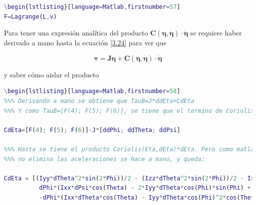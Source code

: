 \documentclass[twoside,11pt]{book}
\begin{document}
\begin{lstlisting}[language=Matlab,firstnumber=56]
\begin{lstlisting}[language=Matlab,firstnumber=57]
F=Lagrange(L,v)
\end{lstlisting}


Para tener una expresión analítica del producto $\pmb{C(\eta,\dot{\eta})\cdot \dot{\eta}}$ se requiere haber derivado a mano hasta la ecuación \ref{3.24} para ver que 

\begin{equation}
\pmb{\tau}=\pmb{J}\ddot{\pmb{\eta}} + \pmb{C(\eta,\dot{\eta})\cdot \dot{\eta}}
\end{equation}

y saber cómo aislar el producto
\singlespacing
\begin{lstlisting}[language=Matlab,firstnumber=57]
\begin{lstlisting}[language=Matlab,firstnumber=58]
%%% Derivando a mano se obtiene que TauB=J*ddEta+CdEta 
%%% Y como TauB=[F(4); F(5); F(6)], se tiene que el termino de Coriolis es:

CdEta=[F(4); F(5); F(6)]-J*[ddPhi; ddTheta; ddPsi]

%%% Hasta se tiene el producto Coriolis(Eta,dEta)*dEta. Pero como matlab
%%% no elimina las aceleraciones se hace a mano, y queda:

CdEta = [(Iyy*dTheta^2*sin(2*Phi))/2 - (Izz*dTheta^2*sin(2*Phi))/2 - Ixx*dPsi*dTheta*cos(Theta) - (Iyy*dPsi^2*sin(2*Phi)*cos(Theta)^2)/2 + (Izz*dPsi^2*sin(2*Phi)*cos(Theta)^2)/2 - Iyy*dPsi*dTheta*cos(2*Phi)*cos(Theta) + Izz*dPsi*dTheta*cos(2*Phi)*cos(Theta);
          dPhi*(Ixx*dPsi*cos(Theta) - 2*Iyy*dTheta*cos(Phi)*sin(Phi) + 2*Izz*dTheta*cos(Phi)*sin(Phi) + Iyy*dPsi*cos(Phi)^2*cos(Theta) - Izz*dPsi*cos(Phi)^2*cos(Theta) - Iyy*dPsi*cos(Theta)*sin(Phi)^2 + Izz*dPsi*cos(Theta)*sin(Phi)^2)  - Ixx*dPsi^2*cos(Theta)*sin(Theta) + Iyy*dPsi^2*cos(Theta)*sin(Phi)^2*sin(Theta)  + Izz*dPsi^2*cos(Phi)^2*cos(Theta)*sin(Theta);
          -dPhi*(Ixx*dTheta*cos(Theta) - Iyy*dTheta*cos(Phi)^2*cos(Theta) + Izz*dTheta*cos(Phi)^2*cos(Theta) + Iyy*dTheta*cos(Theta)*sin(Phi)^2 - Izz*dTheta*cos(Theta)*sin(Phi)^2 - 2*Iyy*dPsi*cos(Phi)*cos(Theta)^2*sin(Phi) + 2*Izz*dPsi*cos(Phi)*cos(Theta)^2*sin(Phi)) - Iyy*dTheta^2*cos(Phi)*sin(Phi)*sin(Theta) + Izz*dTheta^2*cos(Phi)*sin(Phi)*sin(Theta) + 2*Ixx*dPsi*dTheta*cos(Theta)*sin(Theta) - 2*Izz*dPsi*dTheta*cos(Phi)^2*cos(Theta)*sin(Theta) - 2*Iyy*dPsi*dTheta*cos(Theta)*sin(Phi)^2*sin(Theta)]     
\end{lstlisting}
\onehalfspacing
\end{document}
